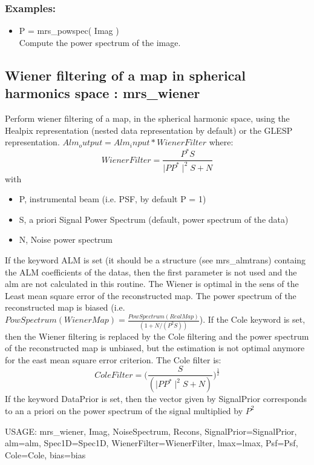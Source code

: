 \subsubsection*{Examples:} 
\begin{itemize}
\item P = mrs\_powspec( Imag ) \\
Compute the power spectrum of the image.
\end{itemize}



\subsection{Wiener filtering of a map in spherical harmonics space : mrs\_wiener}
Perform wiener filtering of a map, in the spherical harmonic space, using the Healpix representation 
(nested data representation by default) or the GLESP representation. $Alm_output = Alm_input * WienerFilter$ where:
\[ WienerFilter =  \frac{ P^ * S}{ \mid P P^ * \mid^2 S + N } \]
with
\begin{itemize}
\item P, instrumental beam (i.e. PSF, by default P = 1)
\item S, a priori Signal Power Spectrum (default, power spectrum of the data)
\item N, Noise power spectrum
\end{itemize}
If the keyword ALM is set (it should be a structure (see mrs\_almtrans) containg the ALM coefficients of the datas, 
then the first parameter is not used and the alm are not calculated in this routine. The Wiener is optimal in the 
sens of the Least mean square error of the reconstructed map. The power spectrum of the reconstructed map is biased 
(i.e. $PowSpectrum(WienerMap) = \frac{PowSpectrum(RealMap)}{ (1 + N / (P^2S) ) }$). If the Cole keyword is set, then 
the Wiener filtering is replaced by the Cole filtering and the power spectrum of the reconstructed map is unbiased, 
but the estimation is not optimal anymore for the east mean square error criterion. The Cole filter is:
\[ ColeFilter =  \Big( \frac{S}{ ( \mid P P^* \mid^2 S + N ) } \Big)^{\frac{1}{2}} \]
If the keyword DataPrior is set, then the vector given by SignalPrior corresponds to an a priori on the power spectrum of the signal multiplied by $P^2$
{\bf
\begin{center}
     USAGE: mrs\_wiener, Imag, NoiseSpectrum, Recons, SignalPrior=SignalPrior, alm=alm, Spec1D=Spec1D, WienerFilter=WienerFilter, lmax=lmax, Psf=Psf, Cole=Cole, bias=bias
\end{center}}
